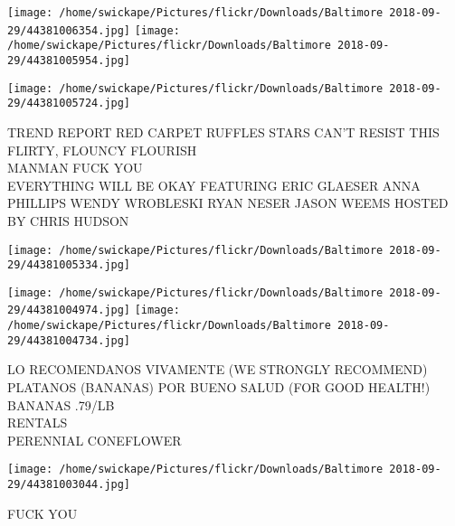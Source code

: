 \documentclass[10pt,letterpaper]{article}
\begin{document}
\texttt{[image: /home/swickape/Pictures/flickr/Downloads/Baltimore 2018-09-29/44381006354.jpg]}
\texttt{[image: /home/swickape/Pictures/flickr/Downloads/Baltimore 2018-09-29/44381005954.jpg]}

\texttt{[image: /home/swickape/Pictures/flickr/Downloads/Baltimore 2018-09-29/44381005724.jpg]}

TREND REPORT RED CARPET RUFFLES STARS CAN'T RESIST THIS FLIRTY, FLOUNCY FLOURISH\\
MANMAN FUCK YOU\\
EVERYTHING WILL BE OKAY FEATURING ERIC GLAESER ANNA PHILLIPS WENDY WROBLESKI RYAN NESER JASON WEEMS HOSTED BY CHRIS HUDSON\\
\pagebreak

\texttt{[image: /home/swickape/Pictures/flickr/Downloads/Baltimore 2018-09-29/44381005334.jpg]}

\vspace{0.25in}
\texttt{[image: /home/swickape/Pictures/flickr/Downloads/Baltimore 2018-09-29/44381004974.jpg]}
\texttt{[image: /home/swickape/Pictures/flickr/Downloads/Baltimore 2018-09-29/44381004734.jpg]}

LO RECOMENDANOS VIVAMENTE (WE STRONGLY RECOMMEND) PLATANOS (BANANAS) POR BUENO SALUD (FOR GOOD HEALTH!) BANANAS .79/LB\\
RENTALS\\
PERENNIAL CONEFLOWER\\
\pagebreak

\texttt{[image: /home/swickape/Pictures/flickr/Downloads/Baltimore 2018-09-29/44381003044.jpg]}

FUCK YOU\\
\pagebreak
\end{document}
